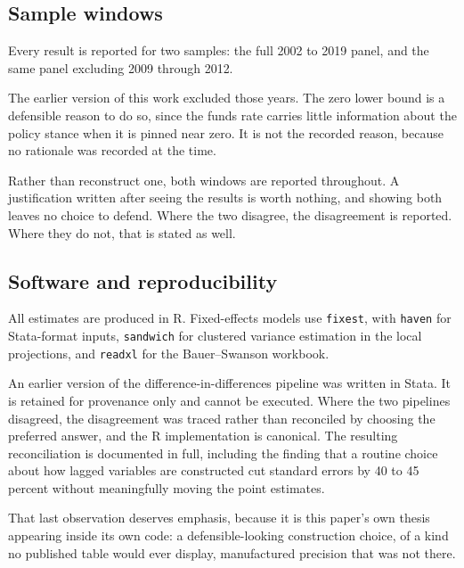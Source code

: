 \subsection{Sample windows}

Every result is reported for two samples: the full 2002 to 2019 panel, and the
same panel excluding 2009 through 2012.

The earlier version of this work excluded those years. The zero lower bound is a
defensible reason to do so, since the funds rate carries little information
about the policy stance when it is pinned near zero. It is not the recorded
reason, because no rationale was recorded at the time.

Rather than reconstruct one, both windows are reported throughout. A
justification written after seeing the results is worth nothing, and showing
both leaves no choice to defend. Where the two disagree, the disagreement is
reported. Where they do not, that is stated as well.

\subsection{Software and reproducibility}

All estimates are produced in R. Fixed-effects models use \texttt{fixest}, with
\texttt{haven} for Stata-format inputs, \texttt{sandwich} for clustered variance
estimation in the local projections, and \texttt{readxl} for the Bauer--Swanson
workbook.

An earlier version of the difference-in-differences pipeline was written in
Stata. It is retained for provenance only and cannot be executed. Where the two
pipelines disagreed, the disagreement was traced rather than reconciled by
choosing the preferred answer, and the R implementation is canonical. The
resulting reconciliation is documented in full, including the finding that a
routine choice about how lagged variables are constructed cut standard errors by
40 to 45 percent without meaningfully moving the point estimates.

That last observation deserves emphasis, because it is this paper's own thesis
appearing inside its own code: a defensible-looking construction choice, of a
kind no published table would ever display, manufactured precision that was not
there.
